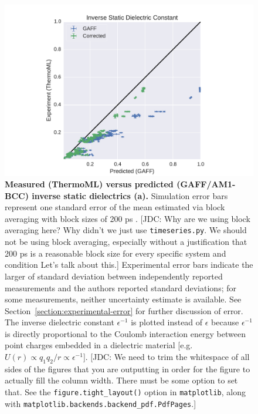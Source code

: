 \documentclass[aps,pre,twocolumn,nofootinbib,superscriptaddress,linenumbers]{revtex4-1}
\begin{document}
\begin{figure}
\includegraphics[width=\columnwidth]{./figures/dielectrics_thermoml.pdf}

\caption{{\bf Measured (ThermoML) versus predicted (GAFF/AM1-BCC) inverse static dielectrics (a).}
Simulation error bars represent one standard error of the mean estimated via block averaging with block sizes of 200 ps \cite{flyvbjerg1989error}.  
{\color{red}[JDC: Why are we using block averaging here?  Why didn't we just use {\tt timeseries.py}. We should not be using block averaging, especially without a justification that 200 ps is a reasonable block size for every specific system and condition  Let's talk about this.]}
Experimental error bars indicate the larger of standard deviation between independently reported measurements and the authors reported standard deviations; for some measurements, neither uncertainty estimate is available.  
See Section~\ref{section:experimental-error} for further discussion of error.  
The inverse dielectric constant $\epsilon^{-1}$ is plotted instead of $\epsilon$ because $\epsilon^{-1}$ is directly proportional to the Coulomb interaction energy between point charges embedded in a dielectric material [e.g. $U(r) \propto q_1 q_2 / r \propto \epsilon^{-1}$].
{\color{red}[JDC: We need to trim the whitespace of all sides of the figures that you are outputting in order for the figure to actually fill the column width.  There must be some option to set that.  See the {\tt figure.tight\_layout()} option in {\tt matplotlib}, along with {\tt matplotlib.backends.backend\_pdf.PdfPages}.]}
}
\label{figure:Dielectric}
\end{figure}

\end{document}
